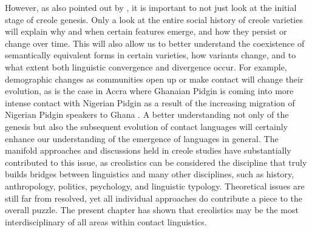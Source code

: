 \documentclass[output=paper]{langscibook}
\begin{document}
However, as also pointed out by \citet{baptista2015continuum, baptista2017competition}, it is important to not just look at the initial stage of creole genesis. Only a look at the entire social history of creole varieties will explain why and when certain features emerge, and how they persist or change over time. This will also allow us to better understand the coexistence of semantically equivalent forms in certain varieties, how variants change, and to what extent both linguistic convergence and divergence occur. For example, demographic changes as communities open up or make contact will change their evolution, as is the case in Accra where Ghanaian Pidgin is coming into more intense contact with Nigerian Pidgin as a result of the increasing migration of Nigerian Pidgin speakers to Ghana \citep{bonnieetal2019multilingualism}. A better understanding not only of the genesis but also the subsequent evolution of contact languages will certainly enhance our understanding of the emergence of languages in general. The manifold approaches and discussions held in creole studies have substantially contributed to this issue, as creolistics can be considered the discipline that truly builds bridges between linguistics and many other disciplines, such as history, anthropology, politics, psychology, and linguistic typology. Theoretical issues are still far from resolved, yet all individual approaches do contribute a piece to the overall puzzle. The present chapter has shown that creolistics may be the most interdisciplinary of all areas within contact linguistics.



\printbibliography[heading=subbibliography,notkeyword=this]
\end{document}
